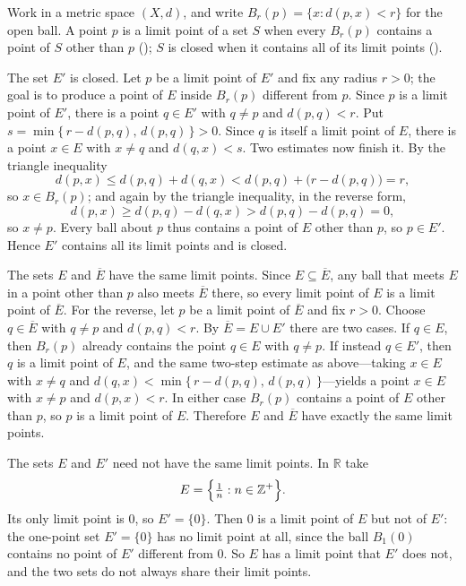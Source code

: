 \documentclass[main.tex]{subfiles}
\begin{document}
\begin{SolutionBlue}
Work in a metric space $(X,d)$, and write $B_r(p)=\{x:d(p,x)<r\}$ for the open ball. A point $p$ is a
limit point of a set $S$ when every $B_r(p)$ contains a point of $S$ other than $p$ ();
$S$ is closed when it contains all of its limit points ().

The set $E'$ is closed. Let $p$ be a limit point of $E'$ and fix any radius $r>0$; the goal is to
produce a point of $E$ inside $B_r(p)$ different from $p$. Since $p$ is a limit point of $E'$, there is
a point $q\in E'$ with $q\neq p$ and $d(p,q)<r$. Put $s=\min\{\,r-d(p,q),\,d(p,q)\,\}>0$. Since $q$ is
itself a limit point of $E$, there is a point $x\in E$ with $x\neq q$ and $d(q,x)<s$. Two estimates now
finish it. By the triangle inequality
\[
  d(p,x)\le d(p,q)+d(q,x)<d(p,q)+\bigl(r-d(p,q)\bigr)=r,
\]
so $x\in B_r(p)$; and again by the triangle inequality, in the reverse form,
\[
  d(p,x)\ge d(p,q)-d(q,x)>d(p,q)-d(p,q)=0,
\]
so $x\neq p$. Every ball about $p$ thus contains a point of $E$ other than $p$, so $p\in E'$. Hence
$E'$ contains all its limit points and is closed.

The sets $E$ and $\overline{E}$ have the same limit points. Since $E\subseteq\overline{E}$, any ball
that meets $E$ in a point other than $p$ also meets $\overline{E}$ there, so every limit point of $E$
is a limit point of $\overline{E}$. For the reverse, let $p$ be a limit point of $\overline{E}$ and fix
$r>0$. Choose $q\in\overline{E}$ with $q\neq p$ and $d(p,q)<r$. By $\overline{E}=E\cup E'$ there are two
cases. If $q\in E$, then $B_r(p)$ already contains the point $q\in E$ with $q\neq p$. If instead $q\in
E'$, then $q$ is a limit point of $E$, and the same two-step estimate as above---taking $x\in E$ with
$x\neq q$ and $d(q,x)<\min\{\,r-d(p,q),\,d(p,q)\,\}$---yields a point $x\in E$ with $x\neq p$ and
$d(p,x)<r$. In either case $B_r(p)$ contains a point of $E$ other than $p$, so $p$ is a limit point of
$E$. Therefore $E$ and $\overline{E}$ have exactly the same limit points.

The sets $E$ and $E'$ need not have the same limit points. In $\mathbb{R}$ take
\[
  E=\Bigl\{\tfrac1n:n\in\mathbb{Z}^{+}\Bigr\}.
\]
Its only limit point is $0$, so $E'=\{0\}$. Then $0$ is a limit point of $E$ but not of $E'$: the
one-point set $E'=\{0\}$ has no limit point at all, since the ball $B_1(0)$ contains no point of $E'$
different from $0$. So $E$ has a limit point that $E'$ does not, and the two sets do not always share
their limit points.
\end{SolutionBlue}
\end{document}
